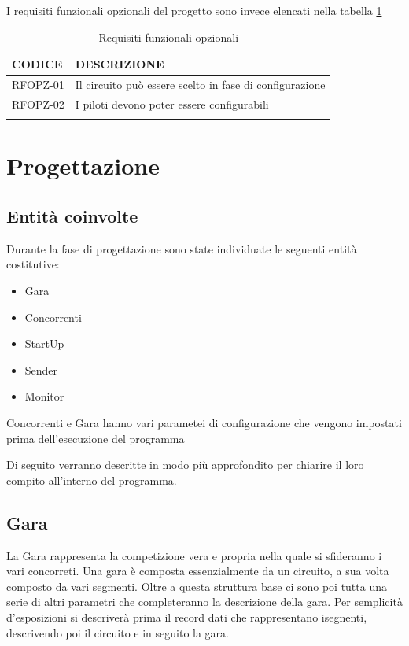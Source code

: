 \documentclass[a4paper,11pt, twoside]{book}
\begin{document}
    I requisiti funzionali opzionali del progetto sono invece elencati nella tabella \ref{tbl:RequisitiFunzionaliOpzionali}
    
    \begin{longtable}{|p{2cm}|p{8cm}|}
      \toprule
	\bfseries{CODICE} & \bfseries{DESCRIZIONE} \\\hline
      \endfirsthead
      RFOPZ-01 & Il circuito può essere scelto in fase di configurazione \\\cline{1-2}
      RFOPZ-02 & I piloti devono poter essere configurabili \\\cline{1-2}
      \caption{Requisiti funzionali opzionali}
      \label{tbl:RequisitiFunzionaliOpzionali}
    \end{longtable}
    
  
  \chapter{Progettazione}
    \section{Entità coinvolte}
      Durante la fase di progettazione sono state individuate le seguenti entità costitutive:
      
      \begin{itemize}
        
	\item Gara 
	\item Concorrenti
	\item StartUp
	\item Sender
	\item Monitor

      \end{itemize}
      
      
      Concorrenti e Gara hanno vari parametei di configurazione che vengono impostati prima 
      dell'esecuzione del programma
      
      Di seguito verranno descritte in modo più approfondito per chiarire il loro compito all'interno del
      programma.
      
    \section{Gara}
      La Gara rappresenta la competizione vera e propria nella quale si sfideranno i vari
      concorreti. 
      Una gara è composta essenzialmente da un circuito, a sua volta composto da vari segmenti. Oltre a 
      questa struttura base ci sono poi tutta una serie di altri parametri che completeranno la descrizione della gara.
      Per semplicità d'esposizioni si descriverà prima il record dati che rappresentano isegnenti, descrivendo poi il
      circuito e in seguito la gara.
      
\end{document}
